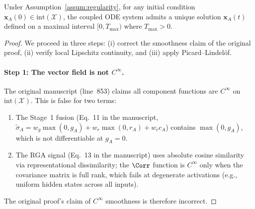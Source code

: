 \begin{proposition}
\label{prop:local-existence}
Under Assumption~\ref{assum:regularity}, for any initial condition
$\mathbf{x}_A(0) \in \text{int}(\mathcal{X})$, the coupled ODE system
admits a unique solution $\mathbf{x}_A(t)$ defined on a maximal interval
$[0, T_{\max})$ where $T_{\max} > 0$.
\end{proposition}

\begin{proof}
We proceed in three steps: (i) correct the smoothness claim of the
original proof, (ii) verify local Lipschitz continuity, and (iii)
apply Picard--Lindelöf.

\paragraph{Step 1: The vector field is not $C^\infty$.}
The original manuscript (line~853) claims all component functions are
$C^\infty$ on $\text{int}(\mathcal{X})$. This is false for two terms:
\begin{enumerate}[nosep]
\item The Stage~1 fusion (Eq.~11 in the manuscript, $\tilde{\sigma}_A = w_g \max(0, g_A) + w_r \max(0, r_A) + w_c c_A$) contains $\max(0, g_A)$,
  which is not differentiable at $g_A = 0$.
\item The RGA signal (Eq.~13 in the manuscript) uses absolute cosine similarity
  via representational dissimilarity; the $\Corr$ function is $C^\infty$
  only when the covariance matrix is full rank, which fails at degenerate
  activations (e.g., uniform hidden states across all inputs).
\end{enumerate}
The original proof's claim of $C^\infty$ smoothness is therefore incorrect.


\end{proof}
